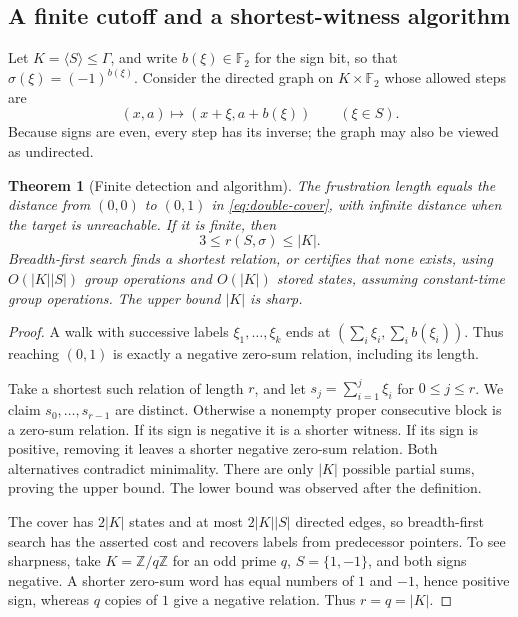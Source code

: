 \documentclass[11pt]{article}
\numberwithin{equation}{section}
\newtheorem{theorem}{Theorem}[section]
\theoremstyle{definition}
\theoremstyle{remark}
\newcommand{\F}{\mathbb F}
\newcommand{\Z}{\mathbb Z}
\begin{document}
\subsection{A finite cutoff and a shortest-witness algorithm}

Let $K=\langle S\rangle\leq\Gamma$, and write
$b(\xi)\in\F_2$ for the sign bit, so that
$\sigma(\xi)=(-1)^{b(\xi)}$. Consider the directed graph on
$K\times\F_2$ whose allowed steps are
\begin{equation}
 (x,a)\longmapsto(x+\xi,a+b(\xi))\qquad(\xi\in S).
 \label{eq:double-cover}
\end{equation}
Because signs are even, every step has its inverse; the graph may also
be viewed as undirected.

\begin{theorem}[Finite detection and algorithm]
\label{thm:bfs}
The frustration length equals the distance from $(0,0)$ to $(0,1)$ in
\eqref{eq:double-cover}, with infinite distance when the target is
unreachable. If it is finite, then
\begin{equation}
 3\leq r(S,\sigma)\leq |K|.
 \label{eq:finite-cutoff}
\end{equation}
Breadth-first search finds a shortest relation, or certifies that none
exists, using $O(|K||S|)$ group operations and $O(|K|)$ stored states,
assuming constant-time group operations. The upper bound $|K|$ is sharp.
\end{theorem}
\begin{proof}
A walk with successive labels $\xi_1,\ldots,\xi_k$ ends at
$(\sum_i\xi_i,\sum_i b(\xi_i))$. Thus reaching $(0,1)$ is exactly a
negative zero-sum relation, including its length.

Take a shortest such relation of length $r$, and let
$s_j=\sum_{i=1}^j\xi_i$ for $0\leq j\leq r$. We claim
$s_0,\ldots,s_{r-1}$ are distinct. Otherwise a nonempty proper
consecutive block is a zero-sum relation. If its sign is negative it
is a shorter witness. If its sign is positive, removing it leaves a
shorter negative zero-sum relation. Both alternatives contradict
minimality. There are only $|K|$ possible partial sums, proving the upper
bound. The lower bound was observed after the definition.

The cover has $2|K|$ states and at most $2|K||S|$ directed edges, so
breadth-first search has the asserted cost and recovers labels from
predecessor pointers. To see sharpness, take $K=\Z/q\Z$ for an odd prime
$q$, $S=\{1,-1\}$, and both signs negative. A shorter zero-sum word has
equal numbers of $1$ and $-1$, hence positive sign, whereas $q$ copies
of $1$ give a negative relation. Thus $r=q=|K|$.
\end{proof}
\end{document}
